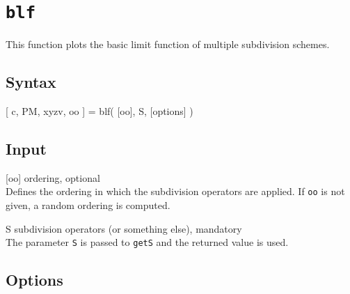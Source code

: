 \section{\texttt{blf}}
This function plots the basic limit function of multiple subdivision schemes.
    
\subsection*{Syntax}
\begin{param}
\item[{[ c, PM, xyzv, oo ] = blf( [oo], S, [options] )}]
\end{param}

\subsection*{Input}
\begin{param}
\item[{[oo]}] ordering, optional\\
Defines the ordering in which the subdivision operators are applied.
If \texttt{oo} is not given, a random ordering is computed.
\item[S] subdivision operators (or something else), mandatory\\
The parameter \texttt{S} is passed to \texttt{getS} and the returned value is used.
\end{param}

\subsection*{Options}

